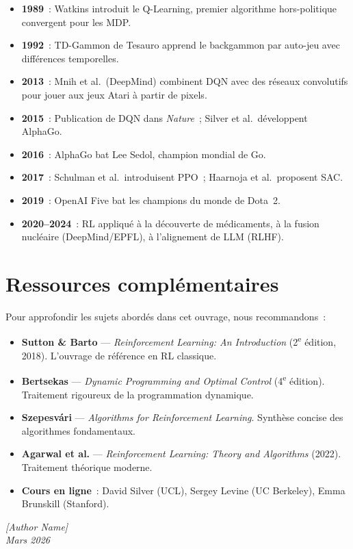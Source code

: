 \begin{itemize}
    \item \textbf{1989}~: Watkins introduit le Q-Learning, premier algorithme
    hors-politique convergent pour les MDP.
    \item \textbf{1992}~: TD-Gammon de Tesauro apprend le backgammon par auto-jeu
    avec diff\'erences temporelles.
    \item \textbf{2013}~: Mnih et al.\ (DeepMind) combinent DQN avec des r\'eseaux
    convolutifs pour jouer aux jeux Atari \`a partir de pixels.
    \item \textbf{2015}~: Publication de DQN dans \emph{Nature}~; Silver et al.\ d\'eveloppent
    AlphaGo.
    \item \textbf{2016}~: AlphaGo bat Lee Sedol, champion mondial de Go.
    \item \textbf{2017}~: Schulman et al.\ introduisent PPO~; Haarnoja et al.\ proposent SAC.
    \item \textbf{2019}~: OpenAI Five bat les champions du monde de Dota~2.
    \item \textbf{2020--2024}~: RL appliqu\'e \`a la d\'ecouverte de m\'edicaments, \`a la
    fusion nucl\'eaire (DeepMind/EPFL), \`a l'alignement de LLM (RLHF).
\end{itemize}

\section*{Ressources compl\'ementaires}

Pour approfondir les sujets abord\'es dans cet ouvrage, nous recommandons~:

\begin{itemize}
    \item \textbf{Sutton \& Barto} --- \emph{Reinforcement Learning: An Introduction}
    (2\textsuperscript{e} \'edition, 2018). L'ouvrage de r\'ef\'erence en RL classique.

    \item \textbf{Bertsekas} --- \emph{Dynamic Programming and Optimal Control}
    (4\textsuperscript{e} \'edition). Traitement rigoureux de la programmation dynamique.

    \item \textbf{Szepesv\'ari} --- \emph{Algorithms for Reinforcement Learning}.
    Synth\`ese concise des algorithmes fondamentaux.

    \item \textbf{Agarwal et al.} --- \emph{Reinforcement Learning: Theory and Algorithms}
    (2022). Traitement th\'eorique moderne.

    \item \textbf{Cours en ligne}~: David Silver (UCL), Sergey Levine (UC Berkeley),
    Emma Brunskill (Stanford).
\end{itemize}

\vfill

\begin{flushright}
\textit{[Author Name]} \\
\textit{Mars 2026}
\end{flushright}
